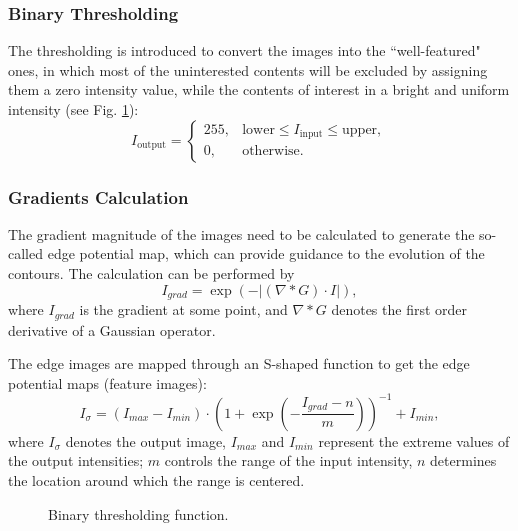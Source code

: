 \subsubsection{Binary Thresholding}

The thresholding is introduced to convert the images into the ``well-featured" ones, in which most of the uninterested contents will be excluded by assigning them a zero intensity value, while the contents of interest in a bright and uniform intensity (see Fig. \ref{fig:BinaryThresholdFunc}): %
\begin{equation}
\label{eqn:BinaryThreshold}
I_{\text{output}} =
\begin{cases}
255, & \text{lower} \le I_{\text{input}} \le \text{upper}, \\%
0,   & \text{otherwise}.
\end{cases}
\end{equation}
%

\subsubsection{Gradients Calculation}

The gradient magnitude of the images need to be calculated to generate the so-called edge potential map, which can provide guidance to the evolution of the contours.
The calculation can be performed by
\begin{equation}
\label{eqn:Gaussian}
I_{grad} = \exp(-|(\nabla \ast G) \cdot I|),
\end{equation}
where $I_{grad}$ is the gradient at some point, and $\nabla \ast G$ denotes the first order derivative of a Gaussian operator.

The edge images are mapped through an S-shaped function to get the edge potential maps (feature images):
\begin{equation}
\label{eqn:Sigmoid}
I_{\sigma} = (I_{max} - I_{min}) \cdot \left(1 + \exp\left(-\frac{I_{grad} - n}{m}\right)\right)^{-1} + I_{min},
\end{equation}
where $I_{\sigma}$ denotes the output image, $I_{max}$ and $I_{min}$ represent the extreme values of the output intensities; $m$ controls the range of the input intensity, $n$ determines the location around which the range is centered. %
\begin{figure}[t]
\centering

\caption{Binary thresholding function.}
\label{fig:BinaryThresholdFunc}
\end{figure}

